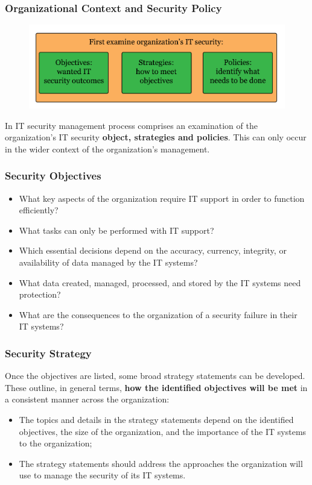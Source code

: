 \documentclass[xcolor ={table,usenames,dvipsnames}]{beamer}
\theoremstyle{definition}
\begin{document}
	\begin{frame}
		\frametitle{Organizational Context and Security Policy}
		\begin{figure}[h!]
			\centering
			\includegraphics[scale=0.20]{img/img_04.PNG}
			\label{Interfacce di un CS}
		\end{figure}
		In IT security management process comprises an examination of the organization's IT security \textbf{object, strategies and policies}. This can only occur in the wider context of the organization's management.
	
	\end{frame}

	\begin{frame}
		\frametitle{Security Objectives}
		\begin{itemize}
			\item What key aspects of the organization require IT support in order to function efficiently?
			\item What tasks can only be performed with IT support?
			\item Which essential decisions depend on the accuracy, currency, integrity, or availability of data managed by the IT systems?
			\item What data created, managed, processed, and stored by the IT systems need
			protection?
			\item What are the consequences to the organization of a security failure in their IT systems?
		\end{itemize}
	\end{frame}

	\begin{frame}
		\frametitle{Security Strategy}
		Once the objectives are listed, some broad strategy statements can be developed.
		These outline, in general terms, \textbf{how the identified objectives will be met} in a consistent manner across the organization:
		\begin{itemize}
			 \item The topics and details in the strategy ­statements
			depend on the identified objectives, the size of the organization, and the importance of the IT systems to the organization; 
			\item The strategy statements should address the approaches the organization will use to manage the security of its IT systems. 
		\end{itemize}	
	\end{frame}
\end{document}
